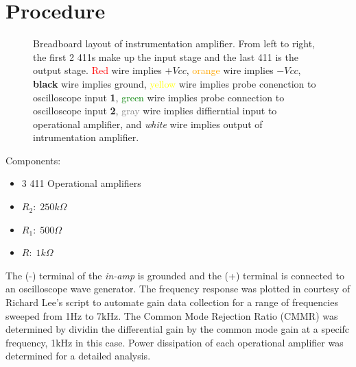 \documentclass{article}
\begin{document}
\section{Procedure}
\begin{figure}[h!]
    \begin{center}
    \end{center}
    \caption{Breadboard layout of instrumentation amplifier. From left to right, the first 2 411s make up the input stage and the last 411 is the output stage. \textcolor{red}{Red} wire implies $+Vcc$, \textcolor{orange}{orange} wire implies $-Vcc$, \textbf{black} wire implies ground, \textcolor{yellow}{yellow} wire implies probe conenction to oscilloscope input \textbf{1}, \textcolor{green}{green} wire implies probe connection to oscilloscope input \textbf{2}, \textcolor{gray}{gray} wire implies diffierntial input to operational amplifier, and \textit{white} wire implies output of intrumentation amplifier.}
    \label{fig:circuit-setup}
\end{figure}

Components: 
\begin{itemize}
    \item 3 411 Operational amplifiers
    \item $R_2:\;250k\Omega$
    \item $R_1:\;500\Omega$
    \item $R:\;1k\Omega$
\end{itemize}

The (-) terminal of the \textit{in-amp} is grounded and the (+) terminal is connected to an oscilloscope wave generator. The frequency response was plotted in courtesy of Richard Lee's script to automate gain data collection for a range of frequencies sweeped from 1Hz to 7kHz. The Common Mode Rejection Ratio (CMMR) was determined by dividin the differential gain by the common mode gain at a specifc frequency, 1kHz in this case. Power dissipation of each operational amplifier was determined for a detailed analysis.
\end{document}
